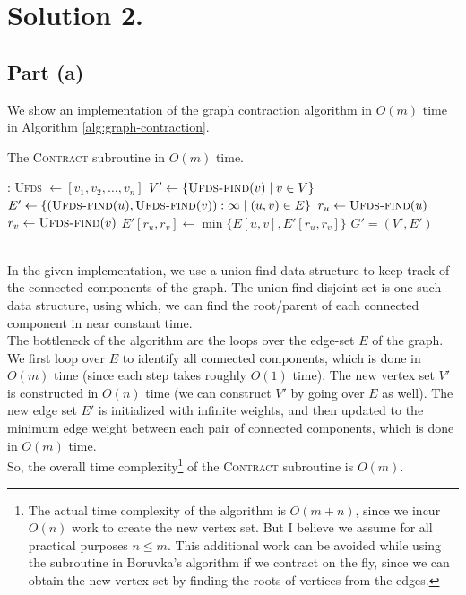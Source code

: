 \documentclass[9pt]{article}
\begin{document}
\section*{Solution 2.}
\subsection*{Part (a)}
We show an implementation of the graph contraction algorithm in $O(m)$ time
in Algorithm \ref{alg:graph-contraction}.
\begin{algorithm}
    \caption{The \textsc{Contract} subroutine in $O(m)$ time.}
    \label{alg:graph-contraction}
    \begin{algorithmic}[1]
        :
            \State \textsc{Ufds} $\gets [v_{1}, v_{2}, \dots, v_{n}]$ 
                    \State {}
                \EndIf
            \EndFor
            \State $V' \gets \{ \Call{Ufds-find}{v} \mid v \in V \}$
            \State $E' \gets \{ (\Call{Ufds-find}{u}, \Call{Ufds-find}{v}): \infty \mid (u, v) \in E \}$ 
                \State $r_{u} \gets \Call{Ufds-find}{u}$
                \State $r_{v} \gets \Call{Ufds-find}{v}$
                    \State $E'[r_{u}, r_{v}] \gets \min\{ E[u, v], E'[r_{u}, r_{v}] \}$ 
                \EndIf
            \EndFor
            \State \Return $G' = (V', E')$
        \EndProcedure
    \end{algorithmic}
\end{algorithm}
\vspace*{0pt} \\
In the given implementation, we use a union-find data structure to keep track of the connected
components of the graph. The union-find disjoint set is one such data structure, using which, we
can find the root/parent of each connected component in near constant time. \\
The bottleneck of the algorithm are the loops over the edge-set $E$ of the graph. We first loop
over $E$ to identify all connected components, which is done in $O(m)$ time (since each step takes
roughly $O(1)$ time). The new vertex set $V'$ is constructed in $O(n)$ time (we can construct $V'$ by
going over $E$ as well). The new edge set $E'$ is initialized with infinite weights, and then
updated to the minimum edge weight between each pair of connected components, which is done in
$O(m)$ time. \\
So, the overall time complexity\footnote{The actual time complexity of the algorithm is $O(m + n)$,
since we incur $O(n)$ work to create the new vertex set. But I believe we assume for all practical
purposes $n \leq m$. This additional work can be avoided while using the subroutine in Boruvka's
algorithm if we contract on the fly, since we can obtain the new vertex set by finding the roots of
vertices from the edges.} of the \textsc{Contract} subroutine is $O(m)$.
\end{document}
